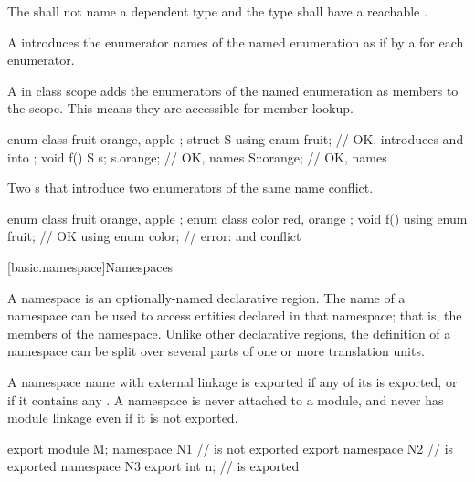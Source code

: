\pnum
The 
shall not name a dependent type
and the type shall have a reachable .

\pnum
A 
introduces the enumerator names of the named enumeration
as if by a  for each enumerator.

\pnum
\begin{note}
A  in class scope
adds the enumerators of the named enumeration as members to the scope.
This means they are accessible for member lookup.
\begin{example}
\begin{codeblock}
enum class fruit { orange, apple };
struct S {
  using enum fruit;             // OK, introduces  and  into 
};
void f() {
  S s;
  s.orange;                     // OK, names 
  S::orange;                    // OK, names 
}
\end{codeblock}
\end{example}
\end{note}

\pnum
\begin{note}
Two s
that introduce two enumerators of the same name conflict.
\begin{example}
\begin{codeblock}
enum class fruit { orange, apple };
enum class color { red, orange };
void f() {
  using enum fruit;             // OK
  using enum color;             // error:  and  conflict
}
\end{codeblock}
\end{example}
\end{note}

[basic.namespace]{Namespaces}%

\pnum
A namespace is an optionally-named declarative region. The name of a
namespace can be used to access entities declared in that namespace;
that is, the members of the namespace. Unlike other declarative regions,
the definition of a namespace can be split over several parts of one or
more translation units.

\pnum
\begin{note}
A namespace name with external linkage is exported
if any of its  is exported,
or if it contains any
.
A namespace is never attached to a module,
and never has module linkage
even if it is not exported.
\end{note}
\begin{example}
\begin{codeblock}
export module M;
namespace N1 {}                 //  is not exported
export namespace N2 {}          //  is exported
namespace N3 { export int n; }  //  is exported
\end{codeblock}
\end{example}

